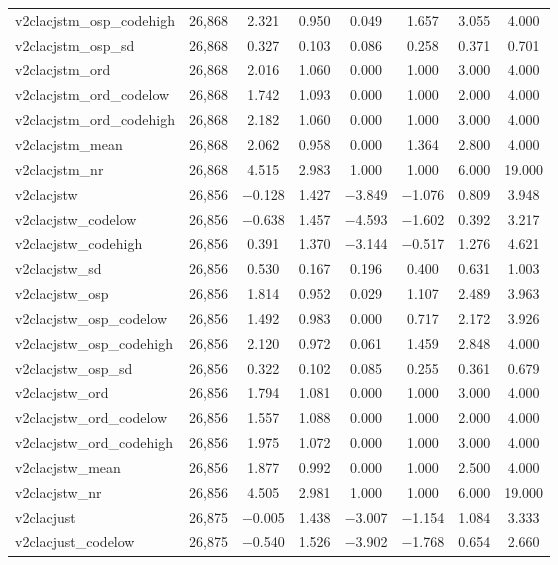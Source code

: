 \begin{table}[!htbp]
\begin{tabular}{@{\extracolsep{5pt}}lccccccc}
v2clacjstm\_osp\_codehigh & 26,868 & 2.321 & 0.950 & 0.049 & 1.657 & 3.055 & 4.000 \\ 
v2clacjstm\_osp\_sd & 26,868 & 0.327 & 0.103 & 0.086 & 0.258 & 0.371 & 0.701 \\ 
v2clacjstm\_ord & 26,868 & 2.016 & 1.060 & 0.000 & 1.000 & 3.000 & 4.000 \\ 
v2clacjstm\_ord\_codelow & 26,868 & 1.742 & 1.093 & 0.000 & 1.000 & 2.000 & 4.000 \\ 
v2clacjstm\_ord\_codehigh & 26,868 & 2.182 & 1.060 & 0.000 & 1.000 & 3.000 & 4.000 \\ 
v2clacjstm\_mean & 26,868 & 2.062 & 0.958 & 0.000 & 1.364 & 2.800 & 4.000 \\ 
v2clacjstm\_nr & 26,868 & 4.515 & 2.983 & 1.000 & 1.000 & 6.000 & 19.000 \\ 
v2clacjstw & 26,856 & $-$0.128 & 1.427 & $-$3.849 & $-$1.076 & 0.809 & 3.948 \\ 
v2clacjstw\_codelow & 26,856 & $-$0.638 & 1.457 & $-$4.593 & $-$1.602 & 0.392 & 3.217 \\ 
v2clacjstw\_codehigh & 26,856 & 0.391 & 1.370 & $-$3.144 & $-$0.517 & 1.276 & 4.621 \\ 
v2clacjstw\_sd & 26,856 & 0.530 & 0.167 & 0.196 & 0.400 & 0.631 & 1.003 \\ 
v2clacjstw\_osp & 26,856 & 1.814 & 0.952 & 0.029 & 1.107 & 2.489 & 3.963 \\ 
v2clacjstw\_osp\_codelow & 26,856 & 1.492 & 0.983 & 0.000 & 0.717 & 2.172 & 3.926 \\ 
v2clacjstw\_osp\_codehigh & 26,856 & 2.120 & 0.972 & 0.061 & 1.459 & 2.848 & 4.000 \\ 
v2clacjstw\_osp\_sd & 26,856 & 0.322 & 0.102 & 0.085 & 0.255 & 0.361 & 0.679 \\ 
v2clacjstw\_ord & 26,856 & 1.794 & 1.081 & 0.000 & 1.000 & 3.000 & 4.000 \\ 
v2clacjstw\_ord\_codelow & 26,856 & 1.557 & 1.088 & 0.000 & 1.000 & 2.000 & 4.000 \\ 
v2clacjstw\_ord\_codehigh & 26,856 & 1.975 & 1.072 & 0.000 & 1.000 & 3.000 & 4.000 \\ 
v2clacjstw\_mean & 26,856 & 1.877 & 0.992 & 0.000 & 1.000 & 2.500 & 4.000 \\ 
v2clacjstw\_nr & 26,856 & 4.505 & 2.981 & 1.000 & 1.000 & 6.000 & 19.000 \\ 
v2clacjust & 26,875 & $-$0.005 & 1.438 & $-$3.007 & $-$1.154 & 1.084 & 3.333 \\ 
v2clacjust\_codelow & 26,875 & $-$0.540 & 1.526 & $-$3.902 & $-$1.768 & 0.654 & 2.660 \\ 

\end{tabular}
\end{table}
